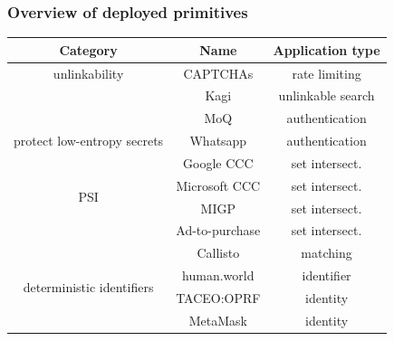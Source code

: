 \documentclass[10pt]{beamer}
\begin{document}
\begin{frame}
  \frametitle{Overview of deployed primitives}
  \begin{table}
    \small
    \centering
    \begin{tabular}{ccc}
      \toprule
      Category & Name & Application type \\
      \midrule
                                                    \multirow[c]{1}{*}{unlinkability}  
               & CAPTCHAs & rate limiting         \\
                                                    & Kagi & unlinkable search         \\
                                                    & MoQ 
                                                    & authentication \\
                                                    \midrule
                                                    \multirow[c]{1}{*}{ protect low-entropy secrets}  
                                                    & Whatsapp  & authentication \\
                                                    \midrule
                                                    \multirow[c]{4}{*}{PSI}  
                                                    &  Google CCC & set intersect. \\
                                                    &  Microsoft CCC & set intersect. \\
                                                    &  MIGP & set intersect. \\
                                                    &  Ad-to-purchase & set intersect. \\
                                                    \midrule
                                                    \multirow[c]{4}{*}{deterministic identifiers}  
                                                    & Callisto & matching   \\
                                                    &  human.world & identifier \\
                                                    &  TACEO:OPRF & identity  \\
                                                    &  MetaMask & identity \\
                                                    \bottomrule
    \end{tabular}
    \label{tab:categories}
  \end{table}
\end{frame}
\end{document}
